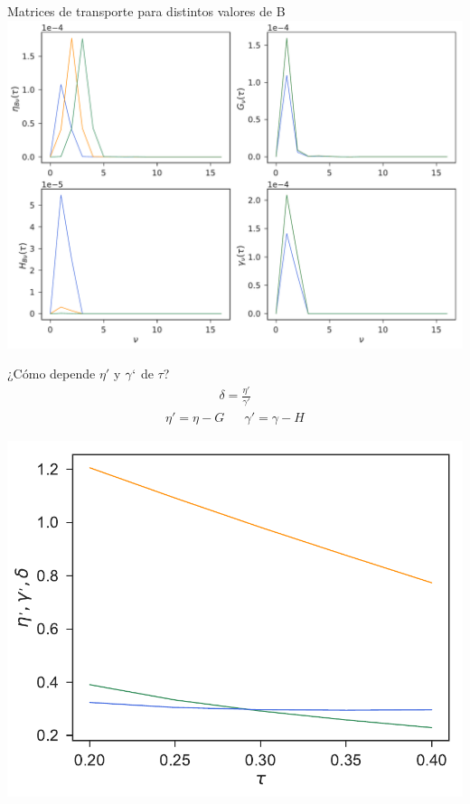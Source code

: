 \documentclass{beamer}
\begin{document}
\begin{frame}{Matrices de transporte para distintos valores de B}
\includegraphics[width=\linewidth]{transportMatrices-17nodes-WALLS}
\end{frame}

\begin{frame}{¿Cómo depende $\eta'$ y $\gamma`$ de $\tau$?}
  \begin{align}
    \delta=\frac{\eta'}{\gamma'}
    \nonumber
  \end{align}
  \begin{align}
    \eta'=\eta-G && \gamma'=\gamma-H
   \nonumber 
  \end{align}
  \begin{center}
\includegraphics[scale=0.41]{tauDependenceSlip-17nodes-WALLS}
  \end{center}
\end{frame}
\end{document}
